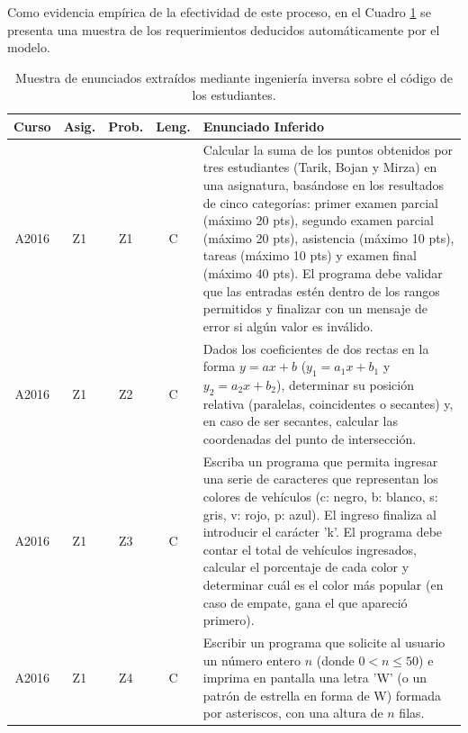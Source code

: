 Como evidencia empírica de la efectividad de este proceso, en el Cuadro \ref{tab:ejemplos-enunciados} se presenta una muestra de los requerimientos deducidos automáticamente por el modelo.

\begin{table}[H]
    \centering
    \caption{Muestra de enunciados extraídos mediante ingeniería inversa sobre el código de los estudiantes.}
    \renewcommand{\arraystretch}{1.3} %
    \small %
    \begin{tabular}{|c|c|c|c|p{8.5cm}|}
        \hline
        \textbf{Curso} & \textbf{Asig.} & \textbf{Prob.} & \textbf{Leng.} & \textbf{Enunciado Inferido} \\ \hline
        A2016 & Z1 & Z1 & C & Calcular la suma de los puntos obtenidos por tres estudiantes (Tarik, Bojan y Mirza) en una asignatura, basándose en los resultados de cinco categorías: primer examen parcial (máximo 20 pts), segundo examen parcial (máximo 20 pts), asistencia (máximo 10 pts), tareas (máximo 10 pts) y examen final (máximo 40 pts). El programa debe validar que las entradas estén dentro de los rangos permitidos y finalizar con un mensaje de error si algún valor es inválido. \\ \hline
        A2016 & Z1 & Z2 & C & Dados los coeficientes de dos rectas en la forma $y = ax + b$ ($y_1 = a_1x + b_1$ y $y_2 = a_2x + b_2$), determinar su posición relativa (paralelas, coincidentes o secantes) y, en caso de ser secantes, calcular las coordenadas del punto de intersección. \\ \hline
        A2016 & Z1 & Z3 & C & Escriba un programa que permita ingresar una serie de caracteres que representan los colores de vehículos (c: negro, b: blanco, s: gris, v: rojo, p: azul). El ingreso finaliza al introducir el carácter 'k'. El programa debe contar el total de vehículos ingresados, calcular el porcentaje de cada color y determinar cuál es el color más popular (en caso de empate, gana el que apareció primero). \\ \hline
        A2016 & Z1 & Z4 & C & Escribir un programa que solicite al usuario un número entero $n$ (donde $0 < n \leq 50$) e imprima en pantalla una letra 'W' (o un patrón de estrella en forma de W) formada por asteriscos, con una altura de $n$ filas. \\ \hline
    \end{tabular}
    \label{tab:ejemplos-enunciados}
\end{table}

